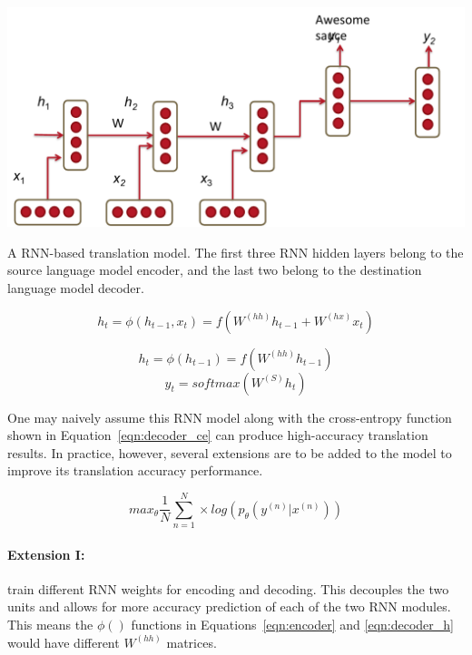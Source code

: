 \documentclass{tufte-handout}
\begin{document}
\begin{marginfigure}
	\centering
	\includegraphics[width=\linewidth]{rnn_translate.pdf}
	\caption {A RNN-based translation model. The first three RNN hidden layers belong to the source language model encoder, and the last two belong to the destination language model decoder.}
	\label{fig:rnn_translate}
\end{marginfigure}

\begin{equation}
	h_t = \phi (h_{t-1}, x_t) = f (W^{(hh)} h_{t-1} + W^{(hx)} x_t)
	\label{eqn:encoder}
\end{equation}

\begin{equation}
	h_t = \phi (h_{t-1}) = f (W^{(hh)} h_{t-1})
	\label{eqn:decoder_h}
\end{equation}
\begin{equation}
	y_t = softmax (W^{(S)}h_t)
	\label{eqn:decoder_y}
\end{equation}

One may naively assume this RNN model along with the cross-entropy function shown in Equation~\ref{eqn:decoder_ce} can produce high-accuracy translation results. In practice, however, several extensions are to be added to the model to improve its translation accuracy performance.

\begin{equation}
	max_{\theta} \dfrac {1}{N} \sum_{n=1}^{N} \times log (p_{\theta} (y^{(n)}|x^{(n)}))
	\label{eqn:decoder_ce}
\end{equation}

\paragraph{Extension I:} train different RNN weights for encoding and decoding. This decouples the two units and allows for more accuracy prediction of each of the two RNN modules. This means the $\phi()$ functions in Equations~\ref{eqn:encoder} and \ref{eqn:decoder_h} would have different $W^{(hh)}$ matrices.
\end{document}
